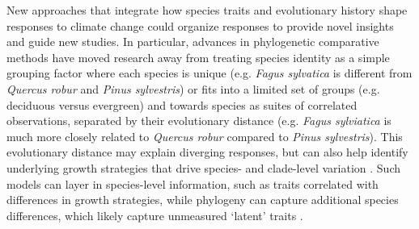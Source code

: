 \documentclass[11pt]{article}
\begin{document}
New approaches that integrate how species traits and evolutionary history shape responses to climate change  \citep{cornwell2017phylogenetic,harmonebook} could organize responses to provide novel insights and guide new studies. In particular, advances in phylogenetic comparative methods \citep{Webb:2002or} have moved research away from treating species identity as a simple grouping factor where each species is unique (e.g. \emph{Fagus sylvatica} is different from \emph{Quercus robur} and \emph{Pinus sylvestris}) or fits into a limited set of groups (e.g. deciduous versus evergreen) and towards species as suites of correlated observations, separated by their evolutionary distance (e.g. \emph{Fagus sylviatica} is much more closely related to \emph{Quercus robur} compared to \emph{Pinus sylvestris}). This evolutionary distance may explain diverging responses, but can also help identify underlying growth strategies that drive species- and clade-level variation \citep[][]{pearse2019interaction,morales2024phylogenetic}. Such models can layer in species-level information, such as traits correlated with differences in growth strategies, while phylogeny can capture additional species differences, which likely capture unmeasured `latent' traits . 

\end{document}
